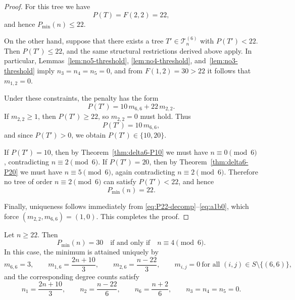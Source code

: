\documentclass[preprint,12pt]{elsarticle}
\begin{document}
\begin{proof}
For this tree we have
\[
P(T)=F(2,2)=22,
\]
and hence $P_{\min}(n)\le 22$.

On the other hand, suppose that there exists a tree $T'\in\mathcal{T}_n^{(6)}$
with $P(T')<22$.
Then $P(T')\le 22$, and the same structural restrictions derived above apply.
In particular, Lemmas~\ref{lem:no5-threshold}, \ref{lem:no4-threshold},
and~\ref{lem:no3-threshold} imply $n_3=n_4=n_5=0$,
and from $F(1,2)=30>22$ it follows that
$m_{1,2}=0$.


Under these constraints, the penalty has the form
\[
P(T')=10\,m_{6,6}+22\,m_{2,2}.
\]
If $m_{2,2}\ge 1$, then $P(T')\ge 22$, so $m_{2,2}=0$ must hold.
Thus
\[
P(T')=10\,m_{6,6},
\]
and since $P(T')>0$, we obtain $P(T')\in\{10,20\}$.

If $P(T')=10$, then by Theorem~\ref{thm:delta6-P10} we must have
$n\equiv 0\pmod 6$, contradicting $n\equiv 2\pmod 6$.
If $P(T')=20$, then by Theorem~\ref{thm:delta6-P20} we must have
$n\equiv 5\pmod 6$, again contradicting $n\equiv 2\pmod 6$.
Therefore no tree of order $n\equiv 2\pmod 6$ can satisfy $P(T')<22$, and hence
\[
P_{\min}(n)=22.
\]


Finally, uniqueness follows immediately from
\eqref{eq:P22-decomp}–\eqref{eq:a1b0}, which force $(m_{2,2},m_{6,6})=(1,0)$.
This completes the proof.
\end{proof}

\begin{theorem}
\label{thm:delta6-P30}
Let $n\ge 22$.
Then
\[
P_{\min}(n)=30
\quad\text{if and only if}\quad
n\equiv 4 \pmod 6.
\]
In this case, the minimum is attained uniquely by
\[
m_{6,6}=3,\qquad
m_{1,6}=\frac{2n+10}{3},\qquad
m_{2,6}=\frac{n-22}{3},
\qquad
m_{i,j}=0\ \text{for all }(i,j)\in S\setminus\{(6,6)\},
\]
and the corresponding degree counts satisfy
\[
n_1=\frac{2n+10}{3},\qquad
n_2=\frac{n-22}{6},\qquad
n_6=\frac{n+2}{6},\qquad
n_3=n_4=n_5=0.
\]
\end{theorem}
\end{document}
